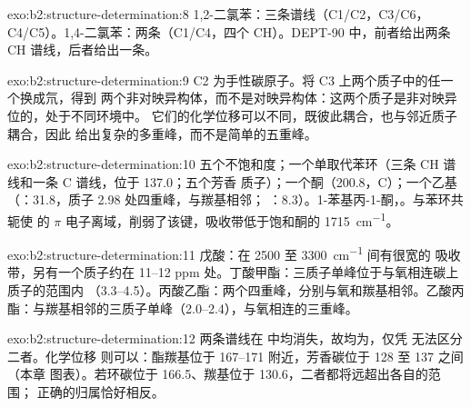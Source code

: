 \begin{solution}{exo:b2:structure-determination:8}
1,2-二氯苯：三条谱线（C1/C2，C3/C6，C4/C5）。1,4-二氯苯：两条（C1/C4，四个
CH）。DEPT-90 中，前者给出两条 CH 谱线，后者给出一条。
\end{solution}

\begin{solution}{exo:b2:structure-determination:9}
C2 为手性碳原子。将 C3 上两个质子中的任一个换成氘，得到
两个非对映异构体，而不是对映异构体：这两个质子是非对映异位的，处于不同环境中。
它们的化学位移可以不同，既彼此耦合，也与邻近质子耦合，因此
 给出复杂的多重峰，而不是简单的五重峰。
\end{solution}

\begin{solution}{exo:b2:structure-determination:10}
五个不饱和度；一个单取代苯环（三条 CH 谱线和一条 C 谱线，位于 137.0；五个芳香
质子）；一个酮（200.8，C）；一个乙基（：31.8，质子 2.98 处四重峰，与羰基相邻；
：8.3）。1-苯基丙-1-酮，。与苯环共轭使  的
$\pi$ 电子离域，削弱了该键，吸收带低于饱和酮的 \qty{1715}{cm^{-1}}。
\end{solution}

\begin{solution}{exo:b2:structure-determination:11}
戊酸：在 2500 至 \qty{3300}{cm^{-1}} 间有很宽的  吸收带，另有一个质子约在 11--12
ppm 处。丁酸甲酯：三质子单峰位于与氧相连碳上质子的范围内
（3.3--4.5）。丙酸乙酯：两个四重峰，分别与氧和羰基相邻。乙酸丙
酯：与羰基相邻的三质子单峰（2.0--2.4），与氧相连的三重峰。
\end{solution}

\begin{solution}{exo:b2:structure-determination:12}
两条谱线在  中均消失，故均为，仅凭  无法区分二者。化学位移
则可以：酯羰基位于 167--171 附近，芳香碳位于 128 至 137 之间（本章
图表）。若环碳位于 166.5、羰基位于 130.6，二者都将远超出各自的范围；
正确的归属恰好相反。
\end{solution}

